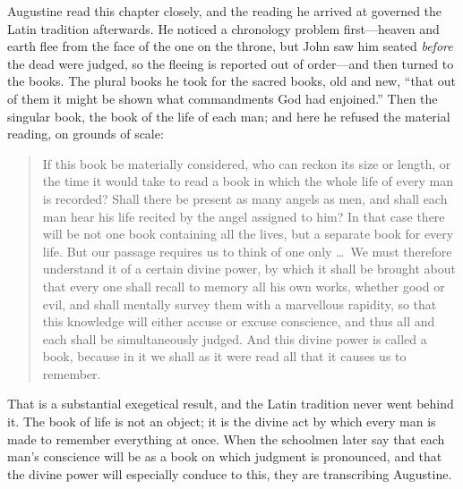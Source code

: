 Augustine read this chapter closely, and the reading he arrived at governed the Latin tradition afterwards. He noticed a chronology problem first---heaven and earth flee from the face of the one on the throne, but John saw him seated \emph{before} the dead were judged, so the fleeing is reported out of order---and then turned to the books. The plural books he took for the sacred books, old and new, ``that out of them it might be shown what commandments God had enjoined.'' Then the singular book, the book of the life of each man; and here he refused the material reading, on grounds of scale:

\begin{quote}
If this book be materially considered, who can reckon its size or length, or the time it would take to read a book in which the whole life of every man is recorded? Shall there be present as many angels as men, and shall each man hear his life recited by the angel assigned to him? In that case there will be not one book containing all the lives, but a separate book for every life. But our passage requires us to think of one only \ldots\ We must therefore understand it of a certain divine power, by which it shall be brought about that every one shall recall to memory all his own works, whether good or evil, and shall mentally survey them with a marvellous rapidity, so that this knowledge will either accuse or excuse conscience, and thus all and each shall be simultaneously judged. And this divine power is called a book, because in it we shall as it were read all that it causes us to remember.
\end{quote}

That is a substantial exegetical result, and the Latin tradition never went behind it. The book of life is not an object; it is the divine act by which every man is made to remember everything at once. When the schoolmen later say that each man's conscience will be as a book on which judgment is pronounced, and that the divine power will especially conduce to this, they are transcribing Augustine.

